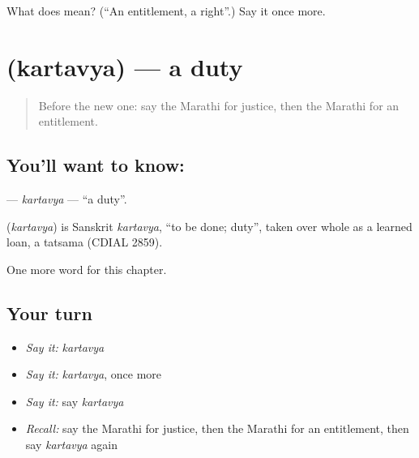 \begin{tcolorbox}[breakable,colback=teal!4,colframe=teal!35!black,title={Before you move on}]
What does  mean? (\textquotedblleft{}An entitlement, a right\textquotedblright{}.) Say it once more.
\end{tcolorbox}
\section[\texorpdfstring{\mr{कर्तव्य} (kartavya)}{कर्तव्य (kartavya)}]{ (kartavya) — a duty}

\label{lesson:MR-C272-kartavya}



\begin{quote}
Before the new one: say the Marathi for justice, then the Marathi for an entitlement.
\end{quote}

\subsection*{You'll want to know: }
\textbf{} — \emph{kartavya} — \textquotedblleft{}a duty\textquotedblright{}.

\begin{cousinweb}
\textbf{} (\emph{kartavya}) is Sanskrit \emph{kartavya}, \textquotedblleft{}to be done; duty\textquotedblright{}, taken over whole as a learned loan, a tatsama (CDIAL 2859).
\end{cousinweb}

\begin{grammarlens}[title={What you've built}]
One more word for this chapter.
\end{grammarlens}

\subsection*{Your turn}
\begin{itemize}
\raggedright
  \item \emph{Say it:} \emph{kartavya}
  \item \emph{Say it:} \emph{kartavya}, once more
  \item \emph{Say it:} say \emph{kartavya}
  \item \emph{Recall:} say the Marathi for justice, then the Marathi for an entitlement, then say \emph{kartavya} again
\end{itemize}

